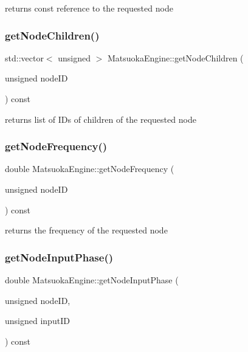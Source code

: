 returns const reference to the requested node 

\mbox{\label{classMatsuokaEngine_a8eb45ab4f1c523f979b3d44dd2c5e508}} 
\subsubsection{\texorpdfstring{get\+Node\+Children()}{getNodeChildren()}}
{\footnotesize\ttfamily std\+::vector$<$ unsigned $>$ Matsuoka\+Engine\+::get\+Node\+Children (\begin{DoxyParamCaption}\item[{unsigned}]{node\+ID }\end{DoxyParamCaption}) const}



returns list of I\+Ds of children of the requested node 

\mbox{\label{classMatsuokaEngine_a88d27453816ff152b17b6e744979e994}} 
\subsubsection{\texorpdfstring{get\+Node\+Frequency()}{getNodeFrequency()}}
{\footnotesize\ttfamily double Matsuoka\+Engine\+::get\+Node\+Frequency (\begin{DoxyParamCaption}\item[{unsigned}]{node\+ID }\end{DoxyParamCaption}) const}



returns the frequency of the requested node 

\mbox{\label{classMatsuokaEngine_a0f7aa58c722f9bce30724d4a62c72374}} 
\subsubsection{\texorpdfstring{get\+Node\+Input\+Phase()}{getNodeInputPhase()}}
{\footnotesize\ttfamily double Matsuoka\+Engine\+::get\+Node\+Input\+Phase (\begin{DoxyParamCaption}\item[{unsigned}]{node\+ID,  }\item[{unsigned}]{input\+ID }\end{DoxyParamCaption}) const}



